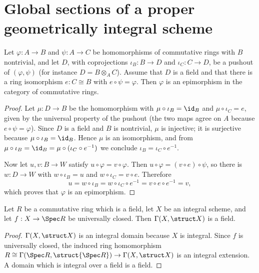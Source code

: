 \section{Global sections of a proper geometrically integral scheme}

\begin{lemma}
  \label{lem:pushout_field_epi}
  \leanok
  Let \(\varphi : A \to B\) and \(\psi : A \to C\) be homomorphisms of commutative rings with
  \(B\) nontrivial, and let \(D\), with coprojections \(\iota_B : B \to D\) and
  \(\iota_C : C \to D\), be a pushout of \((\varphi, \psi)\) (for instance
  \(D = B \otimes_A C\)). Assume that \(D\) is a field and that there is a ring isomorphism
  \(e : C \cong B\) with \(e \circ \psi = \varphi\). Then \(\varphi\) is an epimorphism in the
  category of commutative rings.
\end{lemma}
\begin{proof}
  \leanok
  Let \(\mu : D \to B\) be the homomorphism with \(\mu \circ \iota_B = \id_B\) and
  \(\mu \circ \iota_C = e\), given by the universal property of the pushout (the two maps
  agree on \(A\) because \(e \circ \psi = \varphi\)). Since \(D\) is a field and \(B\) is
  nontrivial, \(\mu\) is injective; it is surjective because \(\mu \circ \iota_B = \id_B\).
  Hence \(\mu\) is an isomorphism, and from
  \(\mu \circ \iota_B = \id_B = \mu \circ (\iota_C \circ e^{-1})\) we conclude
  \(\iota_B = \iota_C \circ e^{-1}\).

  Now let \(u, v : B \to W\) satisfy \(u \circ \varphi = v \circ \varphi\). Then
  \(u \circ \varphi = (v \circ e) \circ \psi\), so there is
  \(w : D \to W\) with \(w \circ \iota_B = u\) and \(w \circ \iota_C = v \circ e\). Therefore
  \[
    u = w \circ \iota_B = w \circ \iota_C \circ e^{-1} = v \circ e \circ e^{-1} = v,
  \]
  which proves that \(\varphi\) is an epimorphism.
\end{proof}

\begin{lemma}
  \label{lem:sections_field}
  \leanok
  Let \(R\) be a commutative ring which is a field, let \(X\) be an integral scheme, and let
  \(f : X \to \Spec R\) be universally closed. Then \(\Gamma(X, \struct X)\) is a field.
\end{lemma}
\begin{proof}
  \leanok
  \(\Gamma(X, \struct X)\) is an integral domain because \(X\) is integral. Since \(f\) is
  universally closed, the induced ring homomorphism
  \(R \cong \Gamma(\Spec R, \struct{\Spec R}) \to \Gamma(X, \struct X)\) is an integral
  extension. A domain which is integral over a field is a field.
\end{proof}

